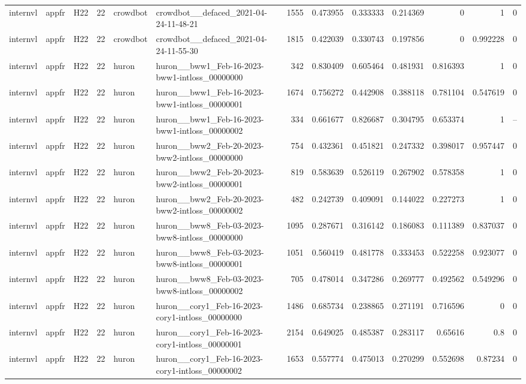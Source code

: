 \begin{longtable}{lllrllrrrrrrr}
internvl & appfr & H22 & 22 & crowdbot & crowdbot\_\_defaced\_2021-04-24-11-48-21 & 1555 & 0.473955 & 0.333333 & 0.214369 & 0 & 1 & 0 \\
internvl & appfr & H22 & 22 & crowdbot & crowdbot\_\_defaced\_2021-04-24-11-55-30 & 1815 & 0.422039 & 0.330743 & 0.197856 & 0 & 0.992228 & 0 \\
internvl & appfr & H22 & 22 & huron & huron\_\_bww1\_Feb-16-2023-bww1-intloss\_00000000 & 342 & 0.830409 & 0.605464 & 0.481931 & 0.816393 & 1 & 0 \\
internvl & appfr & H22 & 22 & huron & huron\_\_bww1\_Feb-16-2023-bww1-intloss\_00000001 & 1674 & 0.756272 & 0.442908 & 0.388118 & 0.781104 & 0.547619 & 0 \\
internvl & appfr & H22 & 22 & huron & huron\_\_bww1\_Feb-16-2023-bww1-intloss\_00000002 & 334 & 0.661677 & 0.826687 & 0.304795 & 0.653374 & 1 & -- \\
internvl & appfr & H22 & 22 & huron & huron\_\_bww2\_Feb-20-2023-bww2-intloss\_00000000 & 754 & 0.432361 & 0.451821 & 0.247332 & 0.398017 & 0.957447 & 0 \\
internvl & appfr & H22 & 22 & huron & huron\_\_bww2\_Feb-20-2023-bww2-intloss\_00000001 & 819 & 0.583639 & 0.526119 & 0.267902 & 0.578358 & 1 & 0 \\
internvl & appfr & H22 & 22 & huron & huron\_\_bww2\_Feb-20-2023-bww2-intloss\_00000002 & 482 & 0.242739 & 0.409091 & 0.144022 & 0.227273 & 1 & 0 \\
internvl & appfr & H22 & 22 & huron & huron\_\_bww8\_Feb-03-2023-bww8-intloss\_00000000 & 1095 & 0.287671 & 0.316142 & 0.186083 & 0.111389 & 0.837037 & 0 \\
internvl & appfr & H22 & 22 & huron & huron\_\_bww8\_Feb-03-2023-bww8-intloss\_00000001 & 1051 & 0.560419 & 0.481778 & 0.333453 & 0.522258 & 0.923077 & 0 \\
internvl & appfr & H22 & 22 & huron & huron\_\_bww8\_Feb-03-2023-bww8-intloss\_00000002 & 705 & 0.478014 & 0.347286 & 0.269777 & 0.492562 & 0.549296 & 0 \\
internvl & appfr & H22 & 22 & huron & huron\_\_cory1\_Feb-16-2023-cory1-intloss\_00000000 & 1486 & 0.685734 & 0.238865 & 0.271191 & 0.716596 & 0 & 0 \\
internvl & appfr & H22 & 22 & huron & huron\_\_cory1\_Feb-16-2023-cory1-intloss\_00000001 & 2154 & 0.649025 & 0.485387 & 0.283117 & 0.65616 & 0.8 & 0 \\
internvl & appfr & H22 & 22 & huron & huron\_\_cory1\_Feb-16-2023-cory1-intloss\_00000002 & 1653 & 0.557774 & 0.475013 & 0.270299 & 0.552698 & 0.87234 & 0 \\

\end{longtable}

